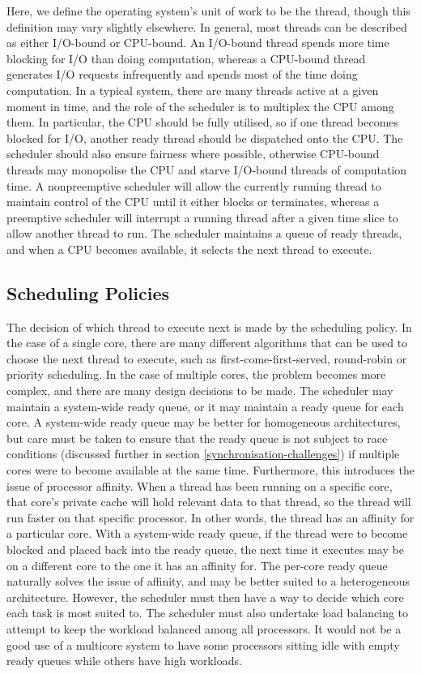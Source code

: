 \documentclass[bsc,frontabs,singlespacing,parskip,deptreport]{infthesis}
\begin{document}
Here, we define the operating system's unit of work to be the thread, though this definition may vary slightly elsewhere. In general, most threads can be described as either I/O-bound or CPU-bound. An I/O-bound thread spends more time blocking for I/O than doing computation, whereas a CPU-bound thread generates I/O requests infrequently and spends most of the time doing computation. In a typical system, there are many threads active at a given moment in time, and the role of the scheduler is to multiplex the CPU among them. In particular, the CPU should be fully utilised, so if one thread becomes blocked for I/O, another ready thread should be dispatched onto the CPU. The scheduler should also ensure fairness where possible, otherwise CPU-bound threads may monopolise the CPU and starve I/O-bound threads of computation time. A nonpreemptive scheduler will allow the currently running thread to maintain control of the CPU until it either blocks or terminates, whereas a preemptive scheduler will interrupt a running thread after a given time slice to allow another thread to run. The scheduler maintains a queue of ready threads, and when a CPU becomes available, it selects the next thread to execute.

\subsection{Scheduling Policies}
\label{scheduling-challenges}
The decision of which thread to execute next is made by the scheduling policy. In the case of a single core, there are many different algorithms that can be used to choose the next thread to execute, such as first-come-first-served, round-robin or priority scheduling. In the case of multiple cores, the problem becomes more complex, and there are many design decisions to be made. The scheduler may maintain a system-wide ready queue, or it may maintain a ready queue for each core. A system-wide ready queue may be better for homogeneous architectures, but care must be taken to ensure that the ready queue is not subject to race conditions (discussed further in section \ref{synchronisation-challenges}) if multiple cores were to become available at the same time. Furthermore, this introduces the issue of processor affinity. When a thread has been running on a specific core, that core’s private cache will hold relevant data to that thread, so the thread will run faster on that specific processor. In other words, the thread has an affinity for a particular core. With a system-wide ready queue, if the thread were to become blocked and placed back into the ready queue, the next time it executes may be on a different core to the one it has an affinity for. The per-core ready queue naturally solves the issue of affinity, and may be better suited to a heterogeneous architecture. However, the scheduler must then have a way to decide which core each task is most suited to. The scheduler must also undertake load balancing to attempt to keep the workload balanced among all processors. It would not be a good use of a multicore system to have some processors sitting idle with empty ready queues while others have high workloads. 
\end{document}
